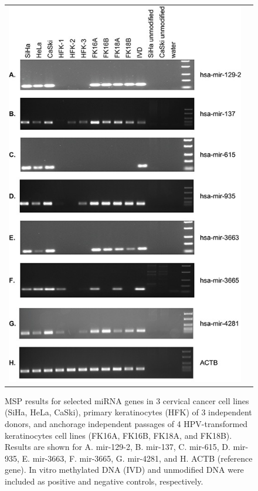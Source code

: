 \begin{figure}[h!]
\centering
\begin{tabular}{cc} 
\includegraphics[scale=2.5]{Figure4.jpg}
\end{tabular}
\caption{MSP results for selected miRNA genes in 3 cervical cancer cell lines (SiHa, HeLa, CaSki), primary keratinocytes (HFK) of 3 independent donors, and anchorage independent passages of 4 HPV-transformed keratinocytes cell lines (FK16A, FK16B, FK18A, and FK18B). Results are shown for A. mir-129-2, B. mir-137, C. mir-615, D. mir-935, E. mir-3663, F. mir-3665, G. mir-4281, and H. ACTB (reference gene). In vitro methylated DNA (IVD) and unmodified DNA were included as positive and negative controls, respectively.}
\label{fig:figure4}
\end{figure}
